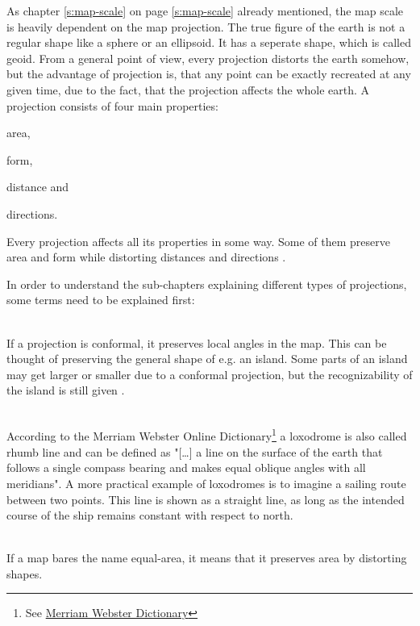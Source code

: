 As chapter \ref{s:map-scale} on page \ref{s:map-scale} already mentioned, the map scale is heavily dependent on the map projection. The true figure of the earth is not a regular shape like a sphere or an ellipsoid. It has a seperate shape, which is called geoid.
From a general point of view, every projection distorts the earth somehow, but the advantage of projection is, that any point can be exactly recreated at any given time, due to the fact, that the projection affects the whole earth.
A projection consists of four main properties:
\begin{enumerate*}
\item area,
\item form,
\item distance and
\item directions.
\end{enumerate*}
Every projection affects all its properties in some way. Some of them preserve area and form while distorting distances and directions .

In order to understand the sub-chapters explaining different types of projections, some terms need to be explained first:

\begin{enumerate}

 \hfill \\
If a projection is conformal, it preserves local angles in the map. This can be thought of preserving the general shape of e.g. an island. Some parts of an island may get larger or smaller due to a conformal projection, but the recognizability of the island is still given .

 \hfill \\
According to the Merriam Webster Online Dictionary\footnote{See \href{http://www.merriam-webster.com/}{Merriam Webster Dictionary}} a loxodrome is also called rhumb line and can be defined as "[\ldots] a line on the surface of the earth that follows a single compass bearing and makes equal oblique angles with all meridians". A more practical example of loxodromes is to imagine a sailing route between two points. This line is shown as a straight line, as long as the intended course of the ship remains constant with respect to north.

 \hfill \\
If a map bares the name equal-area, it means that it preserves area by distorting shapes.

\end{enumerate}


